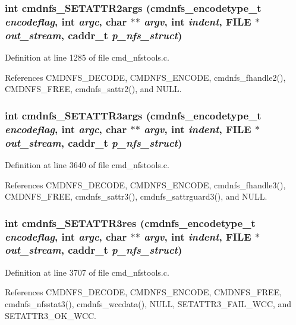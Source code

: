 \subsubsection{\setlength{\rightskip}{0pt plus 5cm}int cmdnfs\_\-SETATTR2args ({\bf cmdnfs\_\-encodetype\_\-t} {\em encodeflag}, int {\em argc}, char $\ast$$\ast$ {\em argv}, int {\em indent}, FILE $\ast$ {\em out\_\-stream}, caddr\_\-t {\em p\_\-nfs\_\-struct})}\label{cmd__nfstools_8h_a31}




Definition at line 1285 of file cmd\_\-nfstools.c.

References CMDNFS\_\-DECODE, CMDNFS\_\-ENCODE, cmdnfs\_\-fhandle2(), CMDNFS\_\-FREE, cmdnfs\_\-sattr2(), and NULL.
\subsubsection{\setlength{\rightskip}{0pt plus 5cm}int cmdnfs\_\-SETATTR3args ({\bf cmdnfs\_\-encodetype\_\-t} {\em encodeflag}, int {\em argc}, char $\ast$$\ast$ {\em argv}, int {\em indent}, FILE $\ast$ {\em out\_\-stream}, caddr\_\-t {\em p\_\-nfs\_\-struct})}\label{cmd__nfstools_8h_a56}




Definition at line 3640 of file cmd\_\-nfstools.c.

References CMDNFS\_\-DECODE, CMDNFS\_\-ENCODE, cmdnfs\_\-fhandle3(), CMDNFS\_\-FREE, cmdnfs\_\-sattr3(), cmdnfs\_\-sattrguard3(), and NULL.
\subsubsection{\setlength{\rightskip}{0pt plus 5cm}int cmdnfs\_\-SETATTR3res ({\bf cmdnfs\_\-encodetype\_\-t} {\em encodeflag}, int {\em argc}, char $\ast$$\ast$ {\em argv}, int {\em indent}, FILE $\ast$ {\em out\_\-stream}, caddr\_\-t {\em p\_\-nfs\_\-struct})}\label{cmd__nfstools_8h_a57}




Definition at line 3707 of file cmd\_\-nfstools.c.

References CMDNFS\_\-DECODE, CMDNFS\_\-ENCODE, CMDNFS\_\-FREE, cmdnfs\_\-nfsstat3(), cmdnfs\_\-wccdata(), NULL, SETATTR3\_\-FAIL\_\-WCC, and SETATTR3\_\-OK\_\-WCC.
